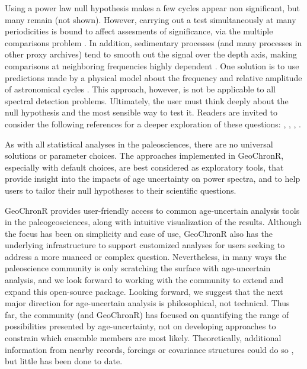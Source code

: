 \documentclass[gchron, manuscript]{copernicus}
\begin{document}
Using a power law null hypothesis makes a few cycles appear non significant, but many remain (not shown).
However, carrying out a test simultaneously at many periodicities is bound to affect assesments of significance, via the multiple comparisons problem \citep{Vaughan_PP2011}.
In addition, sedimentary processes (and many processes in other proxy archives) tend to smooth out the signal over the depth axis, making comparisons at neighboring frequencies highly dependent \citep{Meyers_2012}.
One solution is to use predictions made by a physical model about the frequency and relative amplitude of astronomical cycles \citep{MeyersSageman_2007}.
This approach, however, is not be applicable to all spectral detection problems.
Ultimately, the user must think deeply about the null hypothesis and the most sensible way to test it.
Readers are invited to consider the following references for a deeper exploration of these questions: \citet{Vaughan_PP2011}, \citet{Meyers_2012}, \citet{Meyers_2015}, \citet{MeyersMalinverno2018}.

As with all statistical analyses in the paleosciences, there are no universal solutions or parameter choices.
The approaches implemented in GeoChronR, especially with default choices, are best considered as exploratory tools, that provide insight into the impacts of age uncertainty on power spectra, and to help users to tailor their null hypotheses to their scientific questions.

\conclusions

GeoChronR provides user-friendly access to common age-uncertain analysis tools in the paleogeosciences, along with intuitive visualization of the results.
Although the focus has been on simplicity and ease of use, GeoChronR also has the underlying infrastructure to support customized analyses for users seeking to address a more nuanced or complex question.
Nevertheless, in many ways the paleoscience community is only scratching the surface with age-uncertain analysis, and we look forward to working with the community to extend and expand this open-source package.
Looking forward, we suggest that the next major direction for age-uncertain analysis is philosophical, not technical.
Thus far, the community (and GeoChronR) has focused on quantifying the range of possibilities presented by age-uncertainty, not on developing approaches to constrain which ensemble members are most likely.
Theoretically, additional information from nearby records, forcings or covariance structures could do so \citep{wernerAndTingley}, but little has been done to date.
\end{document}
